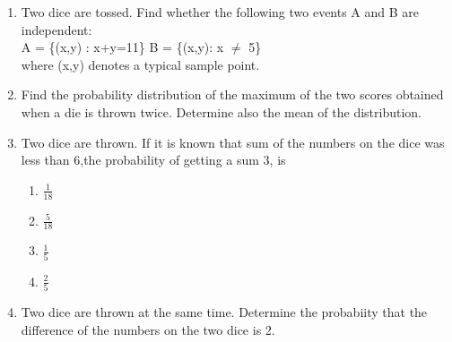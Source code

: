 \begin{enumerate}[label=\thesection.\arabic*,ref=\thesection.\theenumi]
\item Two dice are tossed. Find whether the following two events A and B are independent:\\
A = \{(x,y) : x+y=11\} B = \{(x,y): x $\neq$ 5\}\\
where (x,y) denotes a typical sample point.

\item Find the probability distribution of the maximum of the two scores obtained when a die is thrown twice. Determine also the mean of the distribution.\\

\item Two dice are thrown. If it is known that sum of the numbers on the dice was less than 6,the probability of getting a sum 3, is
\begin{enumerate}[label=\Alph*)]
\item $\frac{1}{18}$ \\
\item $\frac{5}{18}$ \\
\item $\frac{1}{5}$ \\
\item $\frac{2}{5}$ 
\end{enumerate}

\item Two dice are thrown at the same time. Determine the probabiity that the difference
of the numbers on the two dice is 2. \\

\end{enumerate}
